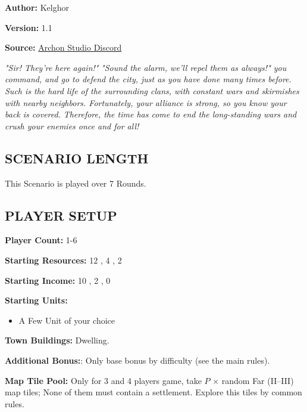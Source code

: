 
\begin{multicols*}{2}

\textbf{Author:} Kelghor

\textbf{Version:} 1.1

\textbf{Source:} \href{https://discord.com/channels/740870068178649108/1309681960179728445}{Archon Studio Discord}

\textit{"Sir! They're here again!"}
\textit{"Sound the alarm, we'll repel them as always!" you command, and go to defend the city, just as you have done many times before. Such is the hard life of the surrounding clans, with constant wars and skirmishes with nearby neighbors. Fortunately, your alliance is strong, so you know your back is covered.}
\textit{Therefore, the time has come to end the long-standing wars and crush your enemies once and for all!}

\subsection*{\MakeUppercase{Scenario Length}}

This Scenario is played over 7 Rounds.

\subsection*{\MakeUppercase{Player Setup}}

\textbf{Player Count:} 1-6

\textbf{Starting Resources:} 12 , 4 , 2 

\textbf{Starting Income:} 10 , 2 , 0 

\textbf{Starting Units:}
\begin{itemize}
  \item A Few  Unit of your choice
\end{itemize}

\textbf{Town Buildings:}  Dwelling.

\textbf{Additional Bonus:}: Only base bonus by difficulty (see the main rules).

\textbf{Map Tile Pool:} Only for 3 and 4 players game, take $P$ × random Far (II–III) map tiles; None of them must contain a settlement. Explore this tiles by common rules.


\end{multicols*}
